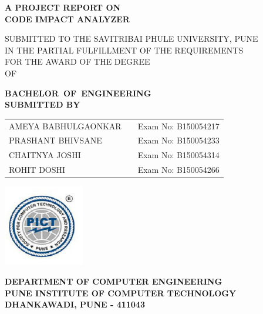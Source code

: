 \documentclass[oneside,a4paper,12pt]{book}
\begin{document}
\setlength{\parindent}{0mm}
\begin{center}
{\bfseries A PROJECT REPORT ON \\}
 \vspace*{2\baselineskip}
{\bfseries \fontsize{16}{15} \selectfont CODE IMPACT ANALYZER \\ \vspace*{2\baselineskip}}
{\fontsize{12}{12} \selectfont SUBMITTED TO THE SAVITRIBAI PHULE UNIVERSITY, PUNE
 \\ IN THE PARTIAL FULFILLMENT OF THE REQUIREMENTS \\ FOR THE AWARD OF THE DEGREE  \\
 \vspace*{1\baselineskip}
 OF

\vspace*{2\baselineskip}}
{\bfseries \fontsize{16}{12} \selectfont\mbox{BACHELOR OF ENGINEERING}\\  
{\bfseries \fontsize{12}{12} \selectfont SUBMITTED BY \\ 
\vspace*{2\baselineskip}} 
{\bfseries \fontsize{12}{12} \selectfont
\begin{center}
\begin{tabular}{ l c c }
 AMEYA BABHULGAONKAR &  & Exam No: B150054217 \\ 
 PRASHANT BHIVSANE&  & Exam No: B150054233\\  
 CHAITNYA JOSHI &  & Exam No: B150054314\\
 ROHIT DOSHI &  & Exam No: B150054266\\
 

\end{tabular}
\end{center}

\vspace*{1\baselineskip}}

\includegraphics[width=100pt]{collegelogo.png} \\
\vskip 0.5cm
{\bfseries \fontsize{16}{15} \selectfont
{\bfseries \fontsize{12}{12} \selectfont 
DEPARTMENT OF COMPUTER ENGINEERING\\
\vspace*{1\baselineskip}
PUNE INSTITUTE OF COMPUTER TECHNOLOGY \\
\vspace*{1\baselineskip}
DHANKAWADI, PUNE - 411043

}}}
\end{center}
\end{document}
